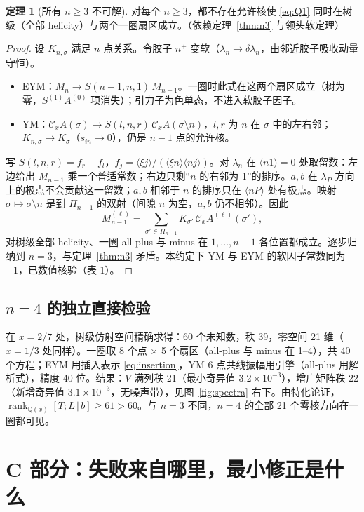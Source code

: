 \documentclass[11pt,a4paper]{ctexart}
\newcommand{\ang}[1]{\langle #1\rangle}
\newcommand{\Cx}{\mathcal C_x}
\newcommand{\Q}{\mathbb Q}
\newcommand{\stat}[2]{\tcbox[on line,colback=#1!10,colframe=#1!70!black,boxrule=0.4pt,arc=1.5pt,
  left=2pt,right=2pt,top=0.6pt,bottom=0.6pt,boxsep=0pt,fontupper=\small\bfseries\color{#1!70!black}]{#2}}
\newcommand{\CAProved}{\stat{ForestGreen}{已证明（计算机辅助）}}
\newcommand{\Numer}{\stat{BurntOrange}{数值证据}}
\theoremstyle{definition}
\newtheorem{theorem}{定理}
\theoremstyle{remark}
\begin{document}
\begin{theorem}[所有 $n\ge3$ 不可解]\label{thm:alln}
对每个 $n\ge3$，都不存在允许核使 \eqref{eq:Q1} 同时在树级（全部 helicity）与两个一圈扇区成立。\hfill\CAProved（依赖定理~\ref{thm:n3} 与领头软定理）
\end{theorem}
\begin{proof}
设 $K_{n,\sigma}$ 满足 $n$ 点关系。令胶子 $n^+$ 变软（$\tilde\lambda_n\to\delta\tilde\lambda_n$，由邻近胶子吸收动量守恒）。
\begin{itemize}
\item EYM：$M_n\to S(n{-}1,n,1)\,M_{n-1}$。一圈时此式在这两个扇区成立（树为零，$S^{(1)}A^{(0)}$ 项消失）；引力子为色单态，不进入软胶子因子。
\item YM：$\Cx A(\sigma)\to S(l,n,r)\,\Cx A(\sigma\setminus n)$，$l,r$ 为 $n$ 在 $\sigma$ 中的左右邻；$K_{n,\sigma}\to\bar K_\sigma$（$s_{in}\to0$），仍是 $n-1$ 点的允许核。
\end{itemize}
写 $S(l,n,r)=f_r-f_l$，$f_j=\ang{\xi j}/(\ang{\xi n}\ang{nj})$。对 $\lambda_n$ 在 $\ang{n1}=0$ 处取留数：左边给出 $M_{n-1}$ 乘一个普适常数；右边只剩“$n$ 的右邻为 1”的排序。$a,b$ 在 $\lambda_P$ 方向上的极点不会贡献这一留数；$a,b$ 相邻于 $n$ 的排序只在 $\ang{nP}$ 处有极点。映射 $\sigma\mapsto\sigma\setminus n$ 是到 $\Pi_{n-1}$ 的双射（间隙 $n$ 为空，$a,b$ 仍不相邻）。因此
\[
M^{(\ell)}_{n-1}=\sum_{\sigma'\in\Pi_{n-1}}\bar K_{\sigma'}\,\Cx A^{(\ell)}(\sigma'),
\]
对树级全部 helicity、一圈 all-plus 与 minus 在 $1,\dots,n-1$ 各位置都成立。逐步归纳到 $n=3$，与定理~\ref{thm:n3} 矛盾。本约定下 YM 与 EYM 的软因子常数同为 $-1$，已数值核验（表 1）。
\end{proof}

\subsection*{\texorpdfstring{$n=4$ 的独立直接检验}{n=4 的独立直接检验}}
在 $x=2/7$ 处，树级仿射空间精确求得：60 个未知数，秩 39，零空间 21 维（$x=1/3$ 处同样）。一圈取 8 个点 $\times$ 5 个扇区（all-plus 与 minus 在 1–4），共 40 个方程；EYM 用插入表示 \eqref{eq:insertion}，YM 6 点共线振幅用引擎（all-plus 用解析式），精度 40 位。结果：$V$ 满列秩 21（最小奇异值 $3.2\times10^{-3}$），增广矩阵秩 22（新增奇异值 $3.1\times10^{-3}$，无噪声带），见图~\ref{fig:spectra} 右下。由特化论证，$\operatorname{rank}_{\Q(x)}[T;L\,|\,b]\ge61>60$。与 $n=3$ 不同，$n=4$ 的全部 21 个零核方向在一圈都可见。\hfill\Numer

\section{C 部分：失败来自哪里，最小修正是什么}
\end{document}
